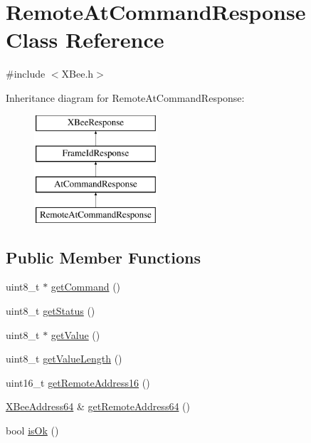 \hypertarget{classRemoteAtCommandResponse}{\section{\-Remote\-At\-Command\-Response \-Class \-Reference}
\label{classRemoteAtCommandResponse}
}


{\ttfamily \#include $<$\-X\-Bee.\-h$>$}

\-Inheritance diagram for \-Remote\-At\-Command\-Response\-:\begin{figure}[H]
\begin{center}
\leavevmode
\includegraphics[height=4.000000cm]{classRemoteAtCommandResponse}
\end{center}
\end{figure}
\subsection*{\-Public \-Member \-Functions}
\begin{DoxyCompactItemize}
\item 
uint8\-\_\-t $\ast$ \hyperlink{classRemoteAtCommandResponse_a6d26d626de8b8d0eaf8241b92ff39f28}{get\-Command} ()
\item 
uint8\-\_\-t \hyperlink{classRemoteAtCommandResponse_afc1b15612ea780c10dc1f33754868548}{get\-Status} ()
\item 
uint8\-\_\-t $\ast$ \hyperlink{classRemoteAtCommandResponse_a3d72d768131c63271a62f75530efda29}{get\-Value} ()
\item 
uint8\-\_\-t \hyperlink{classRemoteAtCommandResponse_a55cf17381e461b8de4a2d5459bfc964a}{get\-Value\-Length} ()
\item 
uint16\-\_\-t \hyperlink{classRemoteAtCommandResponse_a2bea13bca12330a2eb1da3e3f0224bde}{get\-Remote\-Address16} ()
\item 
\hyperlink{classXBeeAddress64}{\-X\-Bee\-Address64} \& \hyperlink{classRemoteAtCommandResponse_ab87802214e04a7058ed0dc9668e70e73}{get\-Remote\-Address64} ()
\item 
bool \hyperlink{classRemoteAtCommandResponse_a0cef7b3846d9c208ebd7ce4473aa90d3}{is\-Ok} ()
\end{DoxyCompactItemize}



